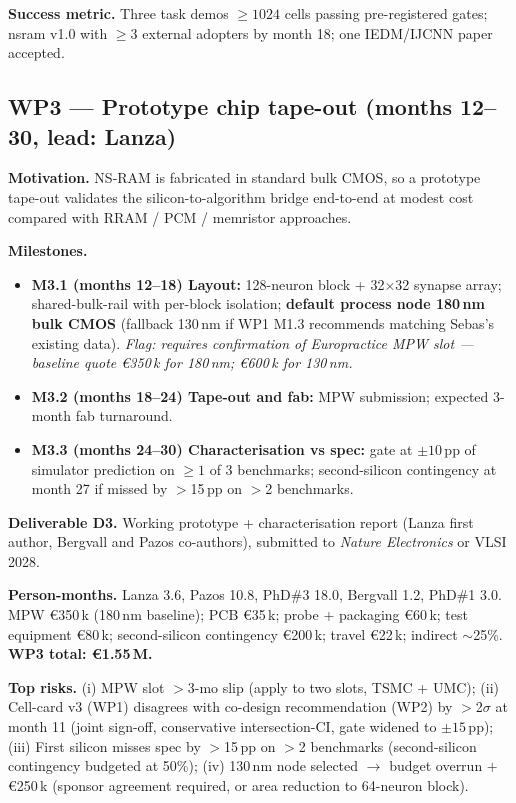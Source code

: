 \textbf{Success metric.} Three task demos $\geq\!1024$ cells passing
pre-registered gates; nsram v1.0 with $\geq\!3$ external adopters by
month 18; one IEDM/IJCNN paper accepted.

\subsection{WP3 --- Prototype chip tape-out (months 12--30, lead:
Lanza)}

\textbf{Motivation.} NS-RAM is fabricated in standard bulk CMOS, so a
prototype tape-out validates the silicon-to-algorithm bridge end-to-end
at modest cost compared with RRAM / PCM / memristor approaches.

\textbf{Milestones.}
\begin{itemize}[leftmargin=1.4em, topsep=2pt, itemsep=1pt]
\item \textbf{M3.1 (months 12--18) Layout:} 128-neuron block +
32$\times$32 synapse array; shared-bulk-rail with per-block isolation;
\textbf{default process node 180\,nm bulk CMOS} (fallback 130\,nm if
WP1 M1.3 recommends matching Sebas's existing data).
\textit{Flag: requires confirmation of Europractice MPW slot — baseline
quote \euro 350\,k for 180\,nm; \euro 600\,k for 130\,nm.}
\item \textbf{M3.2 (months 18--24) Tape-out and fab:} MPW submission;
expected 3-month fab turnaround.
\item \textbf{M3.3 (months 24--30) Characterisation vs spec:} gate at
$\pm 10$\,pp of simulator prediction on $\geq\!1$ of 3 benchmarks;
second-silicon contingency at month 27 if missed by $>$15\,pp on $>$2
benchmarks.
\end{itemize}

\textbf{Deliverable D3.} Working prototype + characterisation report
(Lanza first author, Bergvall and Pazos co-authors), submitted to
\emph{Nature Electronics} or VLSI 2028.

\textbf{Person-months.} Lanza 3.6, Pazos 10.8, PhD\#3 18.0, Bergvall
1.2, PhD\#1 3.0. MPW \euro 350\,k (180\,nm baseline);
PCB \euro 35\,k; probe + packaging \euro 60\,k; test equipment
\euro 80\,k; second-silicon contingency \euro 200\,k; travel
\euro 22\,k; indirect $\sim$25\%.  \textbf{WP3 total: \euro 1.55\,M.}

\textbf{Top risks.} (i) MPW slot $>$3-mo slip (apply to two slots, TSMC
+ UMC); (ii) Cell-card v3 (WP1) disagrees with co-design recommendation
(WP2) by $>$2$\sigma$ at month 11 (joint sign-off, conservative
intersection-CI, gate widened to $\pm 15$\,pp); (iii) First silicon
misses spec by $>$15\,pp on $>$2 benchmarks (second-silicon contingency
budgeted at 50\%); (iv) 130\,nm node selected $\rightarrow$ budget
overrun $+$\euro 250\,k (sponsor agreement required, or area reduction
to 64-neuron block).

